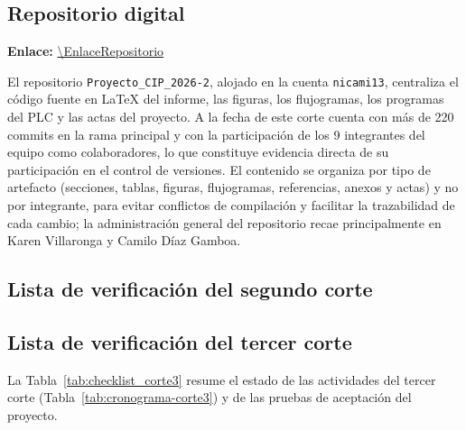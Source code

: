 \subsection{Repositorio digital}
\textbf{Enlace:} \url{\EnlaceRepositorio}

El repositorio \texttt{Proyecto\_CIP\_2026-2}, alojado en la cuenta \texttt{nicami13}, centraliza el código fuente en \LaTeX{} del informe, las figuras, los flujogramas, los programas del PLC y las actas del proyecto. A la fecha de este corte cuenta con más de 220 commits en la rama principal y con la participación de los 9 integrantes del equipo como colaboradores, lo que constituye evidencia directa de su participación en el control de versiones. El contenido se organiza por tipo de artefacto (secciones, tablas, figuras, flujogramas, referencias, anexos y actas) y no por integrante, para evitar conflictos de compilación y facilitar la trazabilidad de cada cambio; la administración general del repositorio recae principalmente en Karen Villaronga y Camilo Díaz Gamboa.

\subsection{Lista de verificación del segundo corte}


\subsection{Lista de verificación del tercer corte}
La Tabla~\ref{tab:checklist_corte3} resume el estado de las actividades del tercer corte (Tabla~\ref{tab:cronograma-corte3}) y de las pruebas de aceptación del proyecto.

